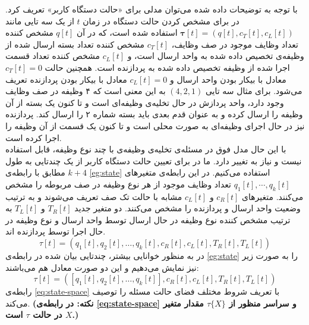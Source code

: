 با توجه به توضیحات داده شده می‌توان مدلی برای «حالت دستگاه کاربر» تعریف کرد. در \cite{Liu} برای مشخص کردن حالت دستگاه در زمان \(t\) از یک سه تایی مانند $\boldsymbol{\tau}[t]=\left(q[t], c_{T}[t], c_{L}[t]\right)$ استفاده شده است، که در آن \(q[t]\) مشخص کننده تعداد وظایف موجود در صف وظایف، \(c_T[t]\) مشخص کننده تعداد بسته ارسال شده از وظیفه‌ی تخصیص داده شده به واحد ارسال است، و \(c_L[t]\) مشخص کننده تعداد قسمت اجرا شده از وظیفه تخصیص داده شده به پردازنده است. همچنین حالت \(c_T[t] = 0\) معادل با بیکار بودن واحد ارسال و \(c_L[t] = 0\) معادل با بیکار بودن پردازنده تعریف می‌شود. برای مثال سه تایی \((4, 2, 1)\) به این معنی است که ۴ وظیفه در صف وظایف وجود دارد، واحد پردازش در حال تخلیه‌ی وظیفه‌ای است و تا کنون یک بسته از آن وظیفه را ارسال کرده و به عنوان قدم بعدی باید بسته شماره ۲ را ارسال کند. پردازنده نیز در حال اجرای وظیفه‌ای به صورت محلی است و تا کنون یک قسمت از آن وظیفه را اجرا کرده است. \\
\newpage
با این حال مدل فوق در مسئله‌ی تخلیه‌ی وظیفه‌ی با چند نوع وظیفه، قابل استفاده نیست و نیاز به تغییر دارد. ما در \CurrentProject برای تعیین حالت دستگاه کاربر از یک چندتایی به طول \(k + 4\) مطابق با رابطه‌ی \ref{eg:state} استفاده می‌کنیم. در این رابطه‌ی متغیرهای
\(q_1[t], \cdots, q_k[t]\)
تعداد وظایف موجود از هر نوع وظیفه در صف مربوطه را مشخص می‌کنند. متغیرهای \(c_R[t]\) و \(c_L[t]\) مشابه با حالت تک صف تعریف می‌شوند و به ترتیب وضعیت واحد ارسال و پردازنده را مشخص می‌کنند. دو متغیر جدید \(T_R[t]\) و \(T_L[t]\) به ترتیب مشخص کننده نوع وظیفه در حال ارسال توسط واحد ارسال و نوع وظیفه در حال اجرا توسط پردازنده اند.
\begin{equation}
	\label{eg:state}
	\tau[t]=\left(q_{1}[t], q_{2}[t], \ldots, q_{k}[t], c_{R}[t], c_{L}[t], T_{R}[t], T_{L}[t]\right)
\end{equation}
در \CurrentProject به منظور خوانایی بیشتر، چندتایی بیان شده در رابطه‌ی \ref{eg:state} را به صورت زیر نیز نمایش می‌دهیم و این دو صورت معادل هم می‌باشند:
\begin{equation}
	\label{eg:state2}
	\tau[t]=\left([q_{1}[t], q_{2}[t], \ldots, q_{k}[t]], c_{R}[t], c_{L}[t], T_{R}[t], T_{L}[t]\right)
\end{equation}
رابطه‌ی \ref{eq:state-space} با تعریف شروط مختلف فضای حالت مسئله را توصیف می‌کند. \textbf{(نکته: در رابطه‌ی \ref{eq:state-space} و سراسر \CurrentProject منظور از \(\tau\{X\}\) مقدار متغیر \(X\) در حالت \(\tau\) است.)}

